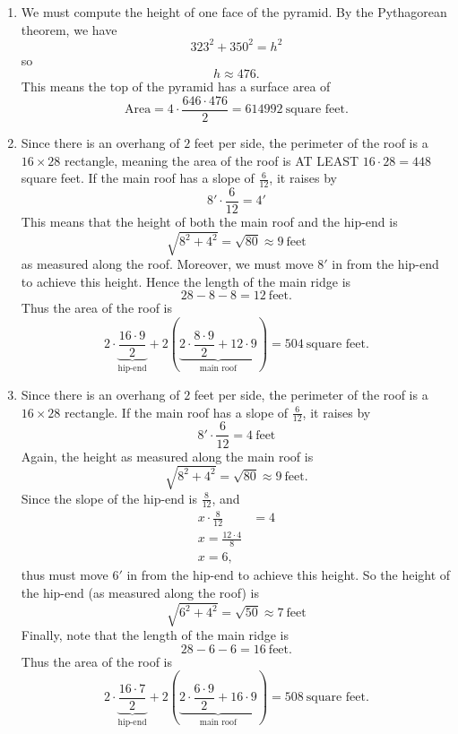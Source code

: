 \documentclass[hints,nooutcomes,noauthor,handout]{ximera}
\begin{document}
\begin{question}
\begin{freeResponse}
  \begin{enumerate}
    \item We must compute the height of one face of the pyramid. By
      the Pythagorean theorem, we have
      \[
      323^2 + 350^2 = h^2
      \]
      so
      \[
      h \approx 476.
      \]
      This means the top of the pyramid has a surface area of
      \[
      \text{Area} = 4\cdot \frac{646\cdot 476}{2} = 614992~\text{square feet}.
      \]
    \item Since there is an overhang of $2$ feet per side, the
      perimeter of the roof is a $16\times 28$ rectangle, meaning the
      area of the roof is AT LEAST $16\cdot 28 = 448$ square feet. If
      the main roof has a slope of $\frac{6}{12}$, it raises by
      \[
      8'\cdot \frac{6}{12}  = 4'
      \]
      This means that the height of both the main roof and the hip-end is
      \[
      \sqrt{8^2+4^2} = \sqrt{80} \approx 9~\text{feet}
      \]
      as measured along the roof. Moreover, we must move $8'$ in from
      the hip-end to achieve this height. Hence the length of the main
      ridge is
      \[
      28-8-8 = 12~\text{feet}.
      \]
      Thus the area of the roof is
      \[
      2\cdot \underbrace{\frac{16\cdot 9}{2}}_{\text{hip-end}} +
      2\left(\underbrace{2\cdot \frac{8\cdot 9}{2} + 12\cdot
        9}_{\text{main roof}}\right) = 504~\text{square feet}.
      \]
    \item Since there is an overhang of $2$ feet per side, the
      perimeter of the roof is a $16\times 28$ rectangle. If the main
      roof has a slope of $\frac{6}{12}$, it raises by
      \[
      8'\cdot \frac{6}{12}  = 4~\text{feet}
      \]
      Again, the height as measured along the main roof is
      \[
      \sqrt{8^2+4^2} = \sqrt{80}\approx 9~\text{feet}.
      \]
      Since the slope of the hip-end is $\frac{8}{12}$, and
      \begin{align*}
        x\cdot \frac{8}{12} &= 4\\
        x = \frac{12\cdot 4}{8}\\
        x = 6,
      \end{align*}
      thus must move $6'$ in from the hip-end to achieve this height.
      So the height of the hip-end (as measured along the roof) is
      \[
      \sqrt{6^2+4^2} = \sqrt{50} \approx 7~\text{feet}
      \]
      Finally, note that the length of the main ridge is
      \[
      28-6-6 = 16~\text{feet}.
      \]
      Thus the area of the roof is
      \[
      2\cdot \underbrace{\frac{16\cdot 7}{2}}_{\text{hip-end}} +
      2\left(\underbrace{2\cdot \frac{6\cdot 9}{2} + 16\cdot
        9}_{\text{main roof}}\right) = 508~\text{square feet}.
      \]
  \end{enumerate}
\end{freeResponse}


\end{question}
\mynewpage
\end{document}
